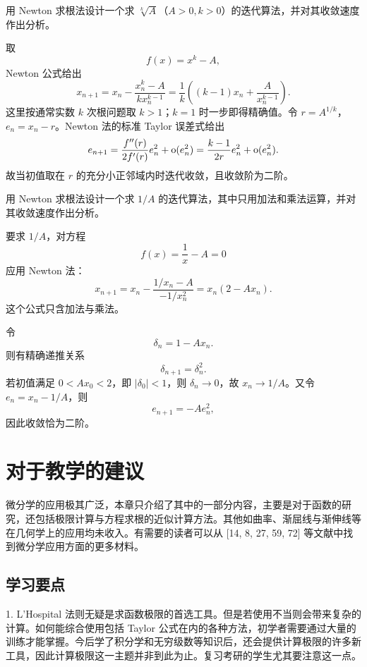 \begin{xexercise}[6]
用 Newton 求根法设计一个求 $\sqrt[k]A$（$A>0,k>0$）的迭代算法，并对其收敛速度作出分析。
\end{xexercise}
\begin{xsolution}
取
\[
  f(x)=x^k-A,
\]
Newton 公式给出
\[
  \boxed{x_{n+1}
  =x_n-\frac{x_n^k-A}{kx_n^{k-1}}
  =\frac1k\left((k-1)x_n+\frac{A}{x_n^{k-1}}\right)}.
\]
这里按通常实数 $k$ 次根问题取 $k>1$；$k=1$ 时一步即得精确值。令 $r=A^{1/k}$，$e_n=x_n-r$。Newton 法的标准 Taylor 误差式给出
\[
  e_{n+1}
  =\frac{f''(r)}{2f'(r)}e_n^2+\mathrm{o}(e_n^2)
  =\frac{k-1}{2r}e_n^2+\mathrm{o}(e_n^2).
\]
故当初值取在 $r$ 的充分小正邻域内时迭代收敛，且收敛阶为二阶。
\end{xsolution}


\begin{xexercise}[7]
用 Newton 求根法设计一个求 $1/A$ 的迭代算法，其中只用加法和乘法运算，并对其收敛速度作出分析。
\end{xexercise}
\begin{xsolution}
要求 $1/A$，对方程
\[
  f(x)=\frac1x-A=0
\]
应用 Newton 法：
\[
  x_{n+1}
  =x_n-\frac{1/x_n-A}{-1/x_n^2}
  =\boxed{x_n(2-Ax_n)}.
\]
这个公式只含加法与乘法。

令
\[
  \delta_n=1-Ax_n.
\]
则有精确递推关系
\[
  \delta_{n+1}=\delta_n^2.
\]
若初值满足 $0<Ax_0<2$，即 $|\delta_0|<1$，则 $\delta_n\to0$，故 $x_n\to1/A$。又令 $e_n=x_n-1/A$，则
\[
  e_{n+1}=-A e_n^2,
\]
因此收敛恰为二阶。
\end{xsolution}


\section{对于教学的建议}

微分学的应用极其广泛，本章只介绍了其中的一部分内容，主要是对于函数的研究，还包括极限计算与方程求根的近似计算方法。其他如曲率、渐屈线与渐伸线等在几何学上的应用均未收入。有需要的读者可以从 [14, 8, 27, 59, 72] 等文献中找到微分学应用方面的更多材料。

\subsection{学习要点}

1. L'Hospital 法则无疑是求函数极限的首选工具。但是若使用不当则会带来复杂的计算。如何能综合使用包括 Taylor 公式在内的各种方法，初学者需要通过大量的训练才能掌握。今后学了积分学和无穷级数等知识后，还会提供计算极限的许多新工具，因此计算极限这一主题并非到此为止。复习考研的学生尤其要注意这一点。

